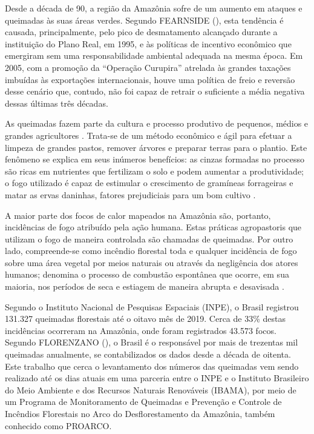 \documentclass[tcc2]{uftex}
\begin{document}
Desde a década de 90, a região da Amazônia sofre de um  aumento em ataques e queimadas às suas áreas verdes. Segundo FEARNSIDE (\citeyear{fearnside06}), esta tendência é causada, principalmente, pelo pico de desmatamento alcançado durante a instituição do Plano Real, em 1995, e às políticas de incentivo econômico que emergiram sem uma responsabilidade ambiental adequada na mesma época. Em 2005, com a promoção da ``Operação Curupira'' atrelada às grandes taxações imbuídas às exportações internacionais, houve uma política de freio e reversão desse cenário que, contudo, não foi capaz de retrair o suficiente a média negativa dessas últimas três décadas.

As queimadas fazem parte da cultura e processo produtivo de pequenos, médios e grandes agricultores \cite{leonel00}. Trata-se de um método econômico e ágil para efetuar a limpeza de grandes pastos, remover árvores e preparar terras para o plantio. Este fenômeno se explica em seus inúmeros benefícios: as cinzas formadas no processo são ricas em nutrientes que fertilizam o solo e podem aumentar a produtividade; o fogo utilizado é capaz de estimular o crescimento de gramíneas forrageiras e matar as ervas daninhas, fatores prejudiciais para um bom cultivo \cite{sodre21}.

A maior parte dos focos de calor mapeados na Amazônia são, portanto, incidências de fogo atribuído pela ação humana. Estas práticas agropastoris que utilizam o fogo de maneira controlada são chamadas de queimadas. Por outro lado, compreende-se como incêndio florestal toda e qualquer incidência de fogo sobre uma área vegetal por meios naturais ou através da negligência dos atores humanos; denomina o processo de combustão espontânea que ocorre, em sua maioria, nos períodos de seca e estiagem de maneira abrupta e desavisada \cite{vigano17,leonel00}.

Segundo o Instituto Nacional de Pesquisas Espaciais (INPE), o Brasil registrou 131.327 queimadas florestais até o oitavo mês de 2019. Cerca de 33\% destas incidências ocorreram na Amazônia, onde foram registrados 43.573 focos. Segundo FLORENZANO (\citeyear{florenzano07}), o Brasil é o responsável por mais de trezentas mil queimadas anualmente, se contabilizados os dados desde a década de oitenta. Este trabalho que cerca o levantamento dos números das queimadas vem sendo realizado até os dias atuais em uma parceria entre o INPE e o Instituto Brasileiro do Meio Ambiente e dos Recursos Naturais Renováveis (IBAMA), por meio de um Programa de Monitoramento de Queimadas e Prevenção e Controle de Incêndios Florestais no Arco do Desflorestamento da Amazônia, também conhecido como PROARCO.
\end{document}
